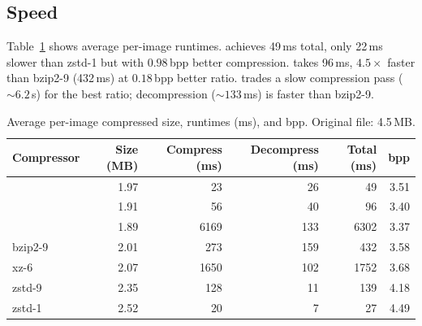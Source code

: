 \subsection{Speed}

Table~\ref{tab:speed} shows average per-image runtimes.
\spdfocused{} achieves 49\,ms total, only 22\,ms slower than zstd-1 but
with $0.98$\,bpp better compression. \allrounder{} takes 96\,ms,
$4.5\times$ faster than bzip2-9 (432\,ms) at $0.18$\,bpp better ratio.
\cmpfocused{} trades a slow compression pass (${\sim}6.2$\,s) for
the best ratio; decompression (${\sim}133$\,ms) is faster than bzip2-9.

\begin{table}[H]
\centering
\caption{Average per-image compressed size, runtimes (ms), and bpp. Original file: 4.5\,MB.}
\label{tab:speed}
\small
\begin{tabular}{lrrrrr}
\toprule
Compressor           & Size (MB) & Compress (ms) & Decompress (ms) & Total (ms) & bpp  \\
\midrule
\spdfocused{}        & 1.97 &    23    &    26      &    49 & 3.51 \\
\allrounder{}          & 1.91 &    56    &    40      &    96 & 3.40 \\
\cmpfocused{}  & 1.89 &  6169    &   133      &  6302 & 3.37 \\
\midrule
bzip2-9              & 2.01 &   273    &   159      &   432 & 3.58 \\
xz-6                 & 2.07 &  1650    &   102      &  1752 & 3.68 \\
zstd-9               & 2.35 &   128    &    11      &   139 & 4.18 \\
zstd-1               & 2.52 &    20    &     7      &    27 & 4.49 \\
\bottomrule
\end{tabular}
\end{table}
